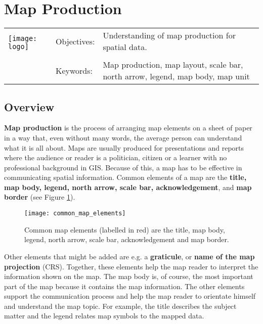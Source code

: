 

\section{Map Production}\label{sec:mapproduction}
\begin{tabular}{p{3.5cm}p{6cm}p{6cm}}
\multirow{2}{*}{\texttt{[image: logo]}} & Objectives: &
Understanding of map production for spatial data. \\
& & \\
& Keywords: & 
Map production, map layout, scale bar, north arrow, legend, map body, map
unit  \\
\hline
\end{tabular}

\subsection{Overview}\label{subsec:overview}

\textbf{Map production} is the process of arranging map elements on a sheet of paper
in a way that, even without many words, the average person can understand
what it is all about. Maps are usually produced for presentations and reports
where the audience or reader is a politician, citizen or a learner with no
professional background in GIS. Because of this, a map has to be effective in
communicating spatial information. Common elements of a map are the \textbf{title,
map body, legend, north arrow, scale bar, acknowledgement}, and \textbf{map
border} (see Figure \ref{fig:mapelements}).

\begin{figure}[ht]
   \begin{center}
   \caption{Common map elements (labelled in red) are the title, map body,
legend, north arrow, scale bar, acknowledgement and map border.}
\label{fig:mapelements}\smallskip
   \texttt{[image: common\_map\_elements]}
\end{center}
\end{figure}

Other elements that might be added are e.g. a \textbf{graticule}, or
\textbf{name of the map projection} (CRS). Together, these elements help the
map reader to interpret
the information shown on the map. The map body is, of course, the most
important part of the map because it contains the map information. The other
elements support the communication process and help the map reader to
orientate himself and understand the map topic. For example, the title
describes the subject matter and the legend relates map symbols to the mapped
data.  

